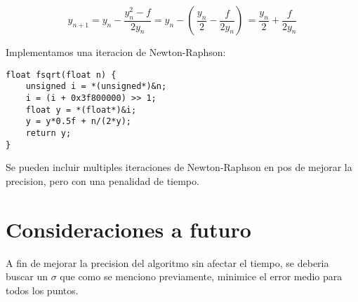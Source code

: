 \documentclass[]{article}
\begin{document}
\begin{equation}
y_{n+1} = y_n - \frac{y_n^{2}-f}{2y_n} = y_n - (\,\frac{y_n}{2} - \frac{f}{2y_n} )\, = \frac{y_n}{2} + \frac{f}{2y_n} 
\end{equation}

Implementamos una iteracion de Newton-Raphson:

\begin{lstlisting}
float fsqrt(float n) {
	unsigned i = *(unsigned*)&n;
	i = (i + 0x3f800000) >> 1;
	float y = *(float*)&i;
	y = y*0.5f + n/(2*y);  
	return y;
}
\end{lstlisting}

Se pueden incluir multiples iteraciones de Newton-Raphson en pos de mejorar la precision, pero con una penalidad de tiempo.

\section{Consideraciones a futuro}
A fin de mejorar la precision del algoritmo sin afectar el tiempo, se deberia buscar un \(\sigma\) que como se menciono previamente, minimice el error medio para todos los puntos.
\end{document}
